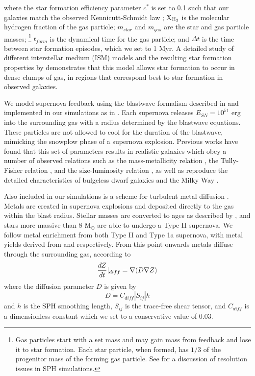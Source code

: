 \documentclass[nofootinbib,twocolumn,prd]{emulateapj}
\begin{document}
\noindent
where the star formation efficiency parameter $c^*$ is set to 0.1 such
that our galaxies match the observed Kennicutt-Schmidt law
\citep{Kennicutt89};  X$_{\rm H_2}$ is the molecular hydrogen fraction of the gas particle; $m_{star}$ and $m_{gas}$ are the star and gas
particle masses; \footnote{Gas particles start with a set mass
 and may gain mass from feedback and lose it to star formation.  Each star particle, when
  formed, has $1/3$ of the progenitor mass of the forming gas particle.  See \cite{Christensen10} for a discussion
of resolution issues in SPH simulations.} 
 $t_{form}$ is the dynamical time for the gas
particle; and $\Delta t$ is the time between star formation episodes,
which we set to 1 Myr.  A detailed study of different interstellar medium (ISM) models and the resulting star formation properties by \citet{Christensen14a} demonstrates that this model allows star formation to occur in dense clumps of gas, in regions that correspond best to star formation in observed galaxies.  

We model supernova feedback using the
blastwave formalism described in \citet{McKee77} and implemented in
our simulations as in \citet{Stinson06}.  Each supernova releases
$E_{SN} = 10^{51}$ erg into the surrounding gas with a radius
determined by the blastwave equations.  These particles are not
allowed to cool for the duration of the blastwave, mimicking the
snowplow phase of a supernova explosion.  Previous works have found
that this set of parameters results in realistic galaxies which obey a
number of observed relations such as the mass-metallicity relation
\citep{Brooks07}, %
 the Tully-Fisher relation \citep{Governato09}, and
the size-luminosity relation \citep{Brooks11}, as well as reproduce
the detailed characteristics of bulgeless dwarf galaxies
\citep{Governato10} and the Milky Way \citep{Guedes11}.


Also included in our simulations is a scheme for turbulent metal
diffusion \citep{Shen10}.  Metals are created in supernova explosions
and deposited directly to the gas within the blast radius.  Stellar
masses are converted to ages as described by \citet{Raiteri96}, and
stars more massive than 8 M$_\odot$ are able to undergo a Type II
supernova.  We follow metal enrichment from both Type II and Type 1a
supernova, with metal yields derived from \citet{Weaver93} and
\citet{Thielemann86} respectively.  From this point onwards metals
diffuse through the surrounding gas, according to 
\begin{equation}
\frac{dZ}{dt}|_{diff} = \nabla (D \nabla {Z}) \\
\end{equation}
%
where the diffusion parameter $D$ is given by
%
\begin{equation}
D = C_{diff} |S_{ij}| h
\end{equation}
%
and $h$ is the SPH smoothing length, $S_{ij}$ is the trace-free shear
tensor, and $C_{diff}$ is a dimensionless constant which we set to a conservative value of 0.03.  
\end{document}
